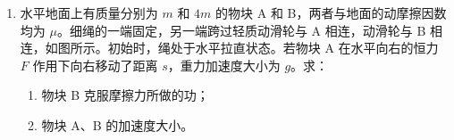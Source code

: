 \documentclass[\gkver]{gaokaozhenti}
\begin{document}
\begin{enumerate}
{（3）为了保证闭合开关时，测量电路部分电压最小，故闭合开关前滑片滑到 M 端。

（4）电压表读数偏小，即相等电压情况下，电流计偏转比标准电压表小，并联电路中电阻越大，电流越小，故电流计的实际电阻偏大。
}

\item
水平地面上有质量分别为 $m$ 和 $4m$ 的物块 A 和 B，两者与地面的动摩擦因数均为 $\mu$。细绳的一端固定，另一端跨过轻质动滑轮与 A 相连，动滑轮与 B 相连，如图所示。初始时，绳处于水平拉直状态。若物块 A 在水平向右的恒力 $F$ 作用下向右移动了距离 $s$，重力加速度大小为 $g$。求：
\begin{enumerate}
	\item
	物块 B 克服摩擦力所做的功；
	\item
	物块 A、B 的加速度大小。
\end{enumerate}


\end{enumerate}
\end{document}

